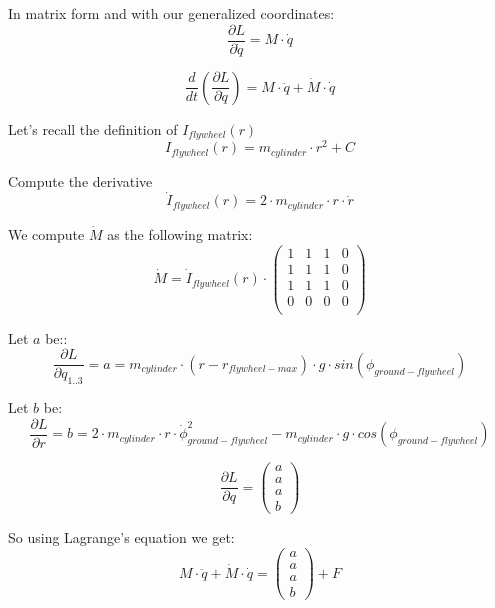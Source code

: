 In matrix form and with our generalized coordinates:
\begin{equation}
	\frac{\partial L}{\partial \dot{q}} =
	M \cdot \dot{q}
\end{equation}

\begin{equation}
	\frac{d}{dt}(\frac{\partial L}{\partial \dot{q}}) =
	 	M \cdot \ddot{q} + \dot{M} \cdot \dot{q} 	
\end{equation}

Let's recall the definition of $I_{flywheel}(r)$
\begin{equation}
	I_{flywheel}(r)= m_{cylinder} \cdot r^2 + C	
\end{equation}


Compute the derivative
\begin{equation}
	\dot{I}_{flywheel}(r)= 2 \cdot m_{cylinder} \cdot r \cdot \dot{r} 	
\end{equation}

We compute $\dot{M}$ as the following matrix:
\begin{equation}
	\dot{M}=
	\dot{I}_{flywheel}(r) \cdot
	\begin{pmatrix} 
		1&
		1&
		1&
		0\\
		1 &
		1 &
		1&
		0\\
		1 &
		1 &
		1 &
		0\\
		0 &
		0 &
		0 &
		0\\
		\end{pmatrix}
\end{equation}

Let $a$ be::
\begin{equation}
	\frac{\partial L}{\partial q_{1..3}} = a = m_{cylinder}\cdot (r-r_{flywheel-max}) \cdot g \cdot sin(\phi_{ground-flywheel})	
\end{equation}

Let $b$ be:
\begin{equation}
	\frac{\partial L}{\partial r} = b = 2 \cdot m_{cylinder} \cdot r  \cdot \dot{\phi}_{ground-flywheel}^2  - m_{cylinder}\cdot g \cdot cos(\phi_{ground-flywheel})	
\end{equation}

\begin{equation}
	\frac{\partial L}{\partial q} = \begin{pmatrix}
	a \\ a \\ a \\ b
	\end{pmatrix}	
\end{equation}

So using Lagrange's equation we get:
\begin{equation}
	\boxed{
	M \cdot \ddot{q} + \dot{M} \cdot \dot{q}= 
	\begin{pmatrix}
		a \\ a \\ a \\ b
		\end{pmatrix}	
 	+ F
	}
\end{equation}